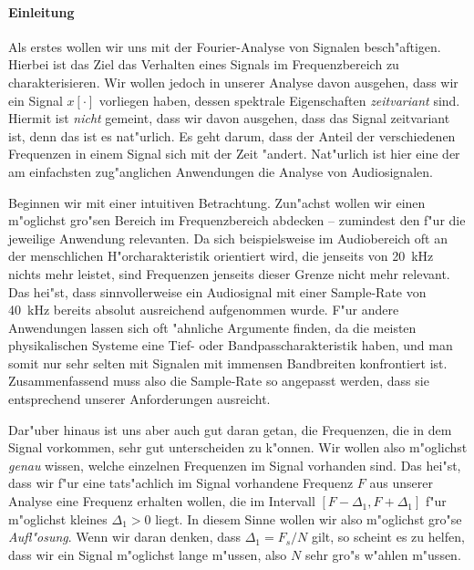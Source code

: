 \paragraph{Einleitung}\label{par:stft:intro}
%
Als erstes wollen wir uns mit der Fourier-Analyse von Signalen besch"aftigen.
Hierbei ist das Ziel das Verhalten eines Signals im Frequenzbereich zu charakterisieren.
Wir wollen jedoch in unserer Analyse davon ausgehen, dass wir ein Signal $x[\cdot]$ vorliegen haben, dessen spektrale Eigenschaften \emph{zeitvariant} sind.
Hiermit ist \emph{nicht} gemeint, dass wir davon ausgehen, dass das Signal zeitvariant ist, denn das ist es nat"urlich.
Es geht darum, dass der Anteil der verschiedenen Frequenzen in einem Signal sich mit der Zeit "andert.
Nat"urlich ist hier eine der am einfachsten zug"anglichen Anwendungen die Analyse von Audiosignalen.

Beginnen wir mit einer intuitiven Betrachtung.
Zun"achst wollen wir einen m"oglichst gro"sen Bereich im Frequenzbereich abdecken -- zumindest den f"ur die jeweilige Anwendung relevanten.
Da sich beispielsweise im Audiobereich oft an der menschlichen H"orcharakteristik orientiert wird, die jenseits von \SI{20}{\kilo\hertz} nichts mehr leistet, sind Frequenzen jenseits dieser Grenze nicht mehr relevant.
Das hei"st, dass sinnvollerweise ein Audiosignal mit einer Sample-Rate von \SI{40}{\kilo\hertz} bereits absolut ausreichend aufgenommen wurde.
F"ur andere Anwendungen lassen sich oft "ahnliche Argumente finden, da die meisten physikalischen Systeme eine Tief- oder Bandpasscharakteristik  haben, und man somit nur sehr selten mit Signalen mit immensen Bandbreiten konfrontiert ist.
Zusammenfassend muss also die Sample-Rate so angepasst werden, dass sie entsprechend unserer Anforderungen ausreicht.

Dar"uber hinaus ist uns aber auch gut daran getan, die Frequenzen, die in dem Signal vorkommen, sehr gut unterscheiden zu k"onnen.
Wir wollen also m"oglichst \emph{genau} wissen, welche einzelnen Frequenzen im Signal vorhanden sind. 
Das hei"st, dass wir f"ur eine tats"achlich im Signal vorhandene Frequenz $F$ aus unserer Analyse eine Frequenz erhalten wollen, die im Intervall $[F-\Delta_1,F+\Delta_1]$ f"ur m"oglichst kleines $\Delta_1 > 0$ liegt.
In diesem Sinne wollen wir also m"oglichst gro"se \emph{Aufl"osung}.
Wenn wir daran denken, dass $\Delta_1 = F_s/N$ gilt, so scheint es zu helfen, dass wir ein Signal m"oglichst lange  m"ussen, also $N$ sehr gro"s w"ahlen m"ussen.

